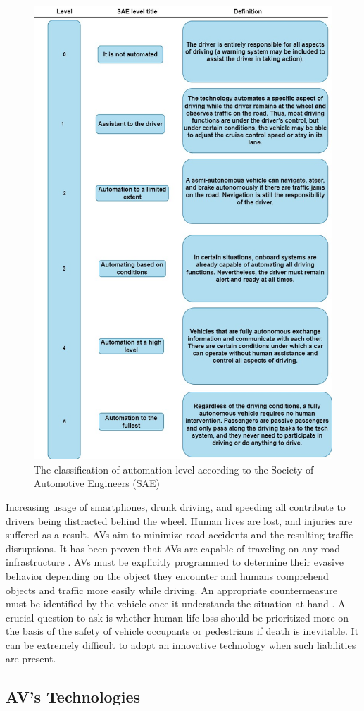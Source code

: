 \documentclass[a4paper,12pt]{article}
\begin{document}
 \begin{figure}[H]
  \centering
  \includegraphics*[width=0.7\columnwidth]{img/SAE}
  \caption{The classification of automation level according to the Society of Automotive Engineers (SAE)}   
  \label{fig:SAE}
\end{figure}
\newpage
Increasing usage of smartphones, drunk driving, and speeding all contribute to drivers being distracted behind the wheel. Human lives are lost, and injuries are suffered as a result. AVs aim to minimize road accidents and the resulting traffic disruptions. It has been proven that AVs are capable of traveling on any road infrastructure \cite{article21}. AVs must be explicitly programmed to determine their evasive behavior depending on the object they encounter and humans comprehend objects and traffic more easily while driving. An appropriate countermeasure must be identified by the vehicle once it understands the situation at hand \cite{article21}. A crucial question to ask is whether human life loss should be prioritized more on the basis of the safety of vehicle occupants or pedestrians if death is inevitable. It can be extremely difficult to adopt an innovative technology when such liabilities are present.


\subsection{AV's Technologies}
\end{document}
